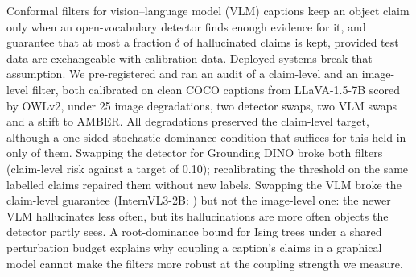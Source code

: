 Conformal filters for vision--language model (VLM) captions keep an object claim only when an open-vocabulary detector finds enough evidence for it, and guarantee that at most a fraction $\delta$ of hallucinated claims is kept, provided test data are exchangeable with calibration data. Deployed systems break that assumption. We pre-registered and ran an audit of a claim-level and an image-level filter, both calibrated on clean COCO captions from LLaVA-1.5-7B scored by OWLv2, under 25 image degradations, two detector swaps, two VLM swaps and a shift to AMBER. All degradations preserved the claim-level target, although a one-sided stochastic-dominance condition that suffices for this held in only \NHtwo{} of them. Swapping the detector for Grounding DINO broke both filters (claim-level risk \GdinoClaim{} against a target of 0.10); recalibrating the threshold on the same labelled claims repaired them without new labels. Swapping the VLM broke the claim-level guarantee (InternVL3-2B: \InternClaim{}) but not the image-level one: the newer VLM hallucinates less often, but its hallucinations are more often objects the detector partly sees. A root-dominance bound for Ising trees under a shared perturbation budget explains why coupling a caption's claims in a graphical model cannot make the filters more robust at the coupling strength we measure.
